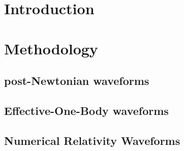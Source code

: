 \documentclass[aps,
prd,
amsmath,
amssymb,
twocolumn,
floatfix,
groupedaddress]{revtex4-1}
\begin{document}
\begin{abstract}
\end{abstract}
\maketitle
\section{Introduction}


\section{Methodology}\label{s1:methodology}

\subsection{post-Newtonian waveforms}\label{s2:PNwaveforms}


\subsection{Effective-One-Body waveforms}\label{s2:EOBwaveforms}



\subsection{Numerical Relativity Waveforms}\label{s2:NRwaveforms}



\end{document}
